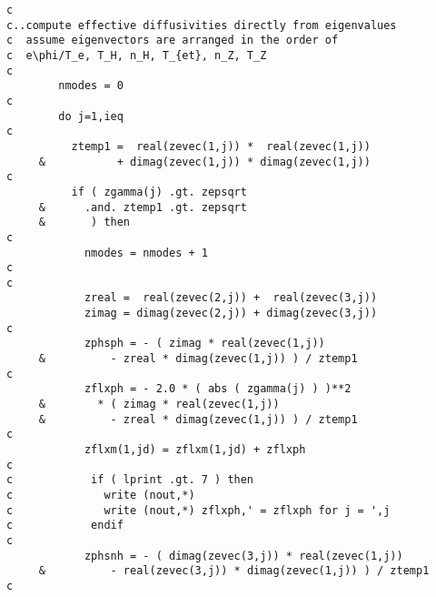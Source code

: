 \begin{verbatim}
c
c..compute effective diffusivities directly from eigenvalues
c  assume eigenvectors are arranged in the order of
c  e\phi/T_e, T_H, n_H, T_{et}, n_Z, T_Z
c
        nmodes = 0
c
        do j=1,ieq
c
          ztemp1 =  real(zevec(1,j)) *  real(zevec(1,j))
     &           + dimag(zevec(1,j)) * dimag(zevec(1,j))
c
          if ( zgamma(j) .gt. zepsqrt
     &      .and. ztemp1 .gt. zepsqrt
     &       ) then
c
            nmodes = nmodes + 1
c
c
            zreal =  real(zevec(2,j)) +  real(zevec(3,j))
            zimag = dimag(zevec(2,j)) + dimag(zevec(3,j))
c
            zphsph = - ( zimag * real(zevec(1,j))
     &          - zreal * dimag(zevec(1,j)) ) / ztemp1
c
            zflxph = - 2.0 * ( abs ( zgamma(j) ) )**2
     &        * ( zimag * real(zevec(1,j))
     &          - zreal * dimag(zevec(1,j)) ) / ztemp1
c
            zflxm(1,jd) = zflxm(1,jd) + zflxph
c
c            if ( lprint .gt. 7 ) then
c              write (nout,*)
c              write (nout,*) zflxph,' = zflxph for j = ',j
c            endif
c
            zphsnh = - ( dimag(zevec(3,j)) * real(zevec(1,j))
     &          - real(zevec(3,j)) * dimag(zevec(1,j)) ) / ztemp1
c


\end{verbatim}
